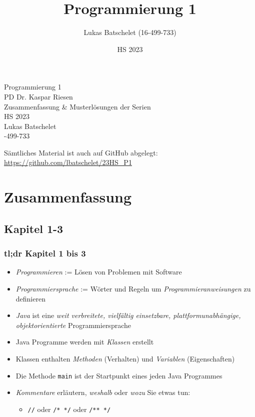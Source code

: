 \documentclass[a4paper,10pt, dvipsnames]{report}
\title{Programmierung 1}
\author{Lukas Batschelet (16-499-733)}
\date{HS 2023}
\newcommand{\github}[1]{%
   \href{#1}{\faGithubSquare}%
}
\begin{document}
\begin{titlepage}
    \begin{center}
        {\huge Programmierung 1}\\[0.5cm]
        {\large PD Dr. Kaspar Riesen}\\[0.3cm]
        {\LARGE Zusammenfassung \& Musterlösungen der Serien}\\[0.5cm]
        {\large HS 2023}\\[2cm]
        {\large Lukas Batschelet}\\[0.3cm]
        {-499-733}\\[0.3cm]
    \end{center}
    \vfill %
    \noindent \github{https://github.com/lbatschelet/23HS_P1} Sämtliches Material ist auch auf GitHub abgelegt: \href{https://github.com/lbatschelet/23HS_P1}{https://github.com/lbatschelet/23HS\_P1}
    \doclicenseThis
\end{titlepage}

\tableofcontents

\part{Zusammenfassung}
\chapter{Kapitel 1-3}

\section{tl;dr Kapitel 1 bis 3}

\begin{itemize}
	\item \textit{Programmieren} := Lösen von Problemen mit Software
	\item \textit{Programmiersprache} := Wörter und Regeln um \textit{Programmieranweisungen} zu definieren
	\item \textit{Java} ist eine \textit{weit verbreitete, vielfältig einsetzbare, plattformunabhängige, objektorientierte} Programmiersprache
	\item Java Programme werden mit \textit{Klassen} erstellt
	\item Klassen enthalten \textit{Methoden} (Verhalten) und \textit{Variablen} (Eigenschaften)
	\item Die Methode \texttt{main} ist der Startpunkt eines jeden Java Programmes
	\item \textit{Kommentare} erläutern, \textit{weshalb} oder \textit{wozu} Sie etwas tun:
	\begin{itemize}
        \item \texttt{//} oder \texttt{/* */} oder \texttt{/** */}
    \end{itemize}
\end{itemize}
\end{document}
